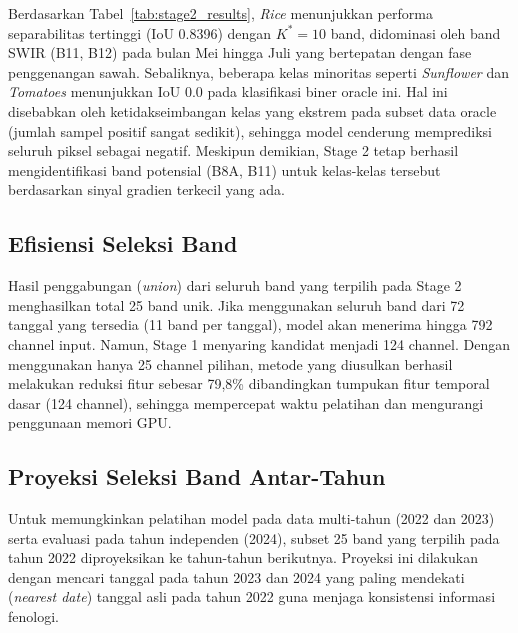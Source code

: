 Berdasarkan Tabel~\ref{tab:stage2_results}, \textit{Rice} menunjukkan performa separabilitas 
tertinggi (IoU 0.8396) dengan $K^* = 10$ band, didominasi oleh band SWIR (B11, B12) pada 
bulan Mei hingga Juli yang bertepatan dengan fase penggenangan sawah. Sebaliknya, beberapa 
kelas minoritas seperti \textit{Sunflower} dan \textit{Tomatoes} menunjukkan IoU 0.0 pada 
klasifikasi biner oracle ini. Hal ini disebabkan oleh ketidakseimbangan kelas yang ekstrem 
pada subset data oracle (jumlah sampel positif sangat sedikit), sehingga model cenderung 
memprediksi seluruh piksel sebagai negatif. Meskipun demikian, Stage 2 tetap berhasil 
mengidentifikasi band potensial (B8A, B11) untuk kelas-kelas tersebut berdasarkan sinyal 
gradien terkecil yang ada.

\subsection{Efisiensi Seleksi Band}

Hasil penggabungan (\textit{union}) dari seluruh band yang terpilih pada Stage 2 menghasilkan 
total 25 band unik. Jika menggunakan seluruh band dari 72 tanggal yang tersedia (11 band per tanggal), 
model akan menerima hingga 792 channel input. Namun, Stage 1 menyaring kandidat menjadi 124 channel. 
Dengan menggunakan hanya 25 channel pilihan, metode yang diusulkan berhasil melakukan reduksi 
fitur sebesar 79,8\% dibandingkan tumpukan fitur temporal dasar (124 channel), sehingga mempercepat 
waktu pelatihan dan mengurangi penggunaan memori GPU.

\subsection{Proyeksi Seleksi Band Antar-Tahun}

Untuk memungkinkan pelatihan model pada data multi-tahun (2022 dan 2023) serta evaluasi 
pada tahun independen (2024), subset 25 band yang terpilih pada tahun 2022 diproyeksikan 
ke tahun-tahun berikutnya. Proyeksi ini dilakukan dengan mencari tanggal pada tahun 2023 
dan 2024 yang paling mendekati (\textit{nearest date}) tanggal asli pada tahun 2022 guna 
menjaga konsistensi informasi fenologi.

